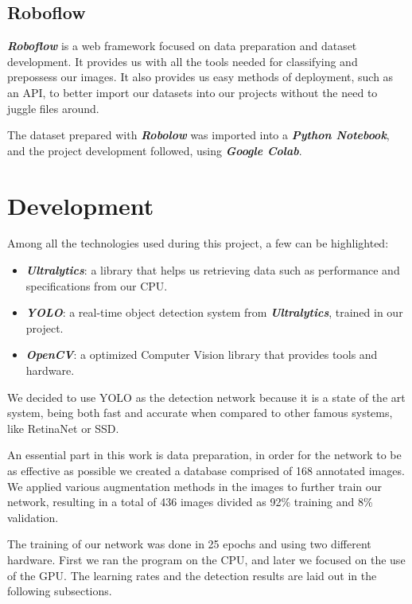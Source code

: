 \documentclass[conference]{IEEEtran}
\begin{document}
\subsection{Roboflow}

\textit{\textbf{Roboflow}} is a web framework focused on data preparation and dataset development. It provides us with all the tools needed for classifying and prepossess our images. It also provides us easy methods of deployment, such as an API, to better import our datasets into our projects without the need to juggle files around.

The dataset prepared with \textit{\textbf{Robolow}} was imported into a \textit{\textbf{Python Notebook}}, and the project development followed, using \textit{\textbf{Google Colab}}.

\section{Development}

Among all the technologies used during this project, a few can be highlighted:

\begin{itemize}
    \item \textit{\textbf{Ultralytics}}: a library that helps us retrieving data such as performance and specifications from our CPU.
    \item \textit{\textbf{YOLO}}: a real-time object detection system from \textit{\textbf{Ultralytics}}, trained in our project.
    \item \textit{\textbf{OpenCV}}: a optimized Computer Vision library that provides tools and hardware.
\end{itemize}

We decided to use YOLO as the detection network because it is a state of the art system, being both fast and accurate when compared to other famous systems, like RetinaNet or SSD.

An essential part in this work is data preparation, in order for the network to be as effective as possible we created a database comprised of 168 annotated images. We applied various augmentation methods in the images to further train our network, resulting in a total of 436 images divided as 92\% training and 8\% validation.

The training of our network was done in 25 epochs and using two different hardware. First we ran the program on the CPU, and later we focused on the use of the GPU. The learning rates and the detection results are laid out in the following subsections.
\end{document}
